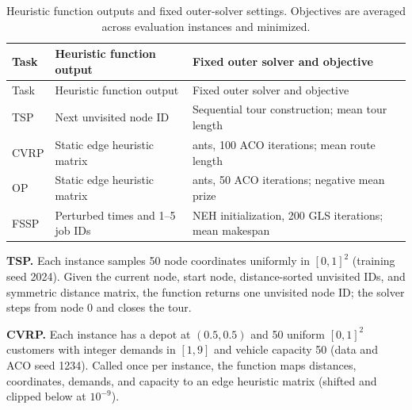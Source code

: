 \documentclass{article}
\begin{document}
\begin{longtable}[]{@{}
  >{\raggedright\arraybackslash}p{}
  >{\raggedright\arraybackslash}p{}
  >{\raggedright\arraybackslash}p{}@{}}
\caption{Heuristic function outputs and fixed outer-solver settings. Objectives are averaged across evaluation instances and minimized.}\tabularnewline
\toprule\noalign{}
\begin{minipage}[b]{\linewidth}\raggedright
Task
\end{minipage} & \begin{minipage}[b]{\linewidth}\raggedright
Heuristic function output
\end{minipage} & \begin{minipage}[b]{\linewidth}\raggedright
Fixed outer solver and objective
\end{minipage} \\
\midrule\noalign{}
\endfirsthead
\toprule\noalign{}
\begin{minipage}[b]{\linewidth}\raggedright
Task
\end{minipage} & \begin{minipage}[b]{\linewidth}\raggedright
Heuristic function output
\end{minipage} & \begin{minipage}[b]{\linewidth}\raggedright
Fixed outer solver and objective
\end{minipage} \\
\midrule\noalign{}
\endhead
\bottomrule\noalign{}
\endlastfoot
TSP & Next unvisited node ID & Sequential tour construction; mean tour length \\
CVRP & Static edge heuristic matrix & 30 ants, 100 ACO iterations; mean route length \\
OP & Static edge heuristic matrix & 20 ants, 50 ACO iterations; negative mean prize \\
FSSP & Perturbed times and 1--5 job IDs & NEH initialization, 200 GLS iterations; mean makespan \\
\end{longtable}

\textbf{TSP.} Each instance samples 50 node coordinates uniformly in \([0,1]^2\) (training seed 2024). Given the current node, start node, distance-sorted unvisited IDs, and symmetric distance matrix, the function returns one unvisited node ID; the solver steps from node 0 and closes the tour.

\textbf{CVRP.} Each instance has a depot at \((0.5,0.5)\) and 50 uniform \([0,1]^2\) customers with integer demands in \([1,9]\) and vehicle capacity 50 (data and ACO seed 1234). Called once per instance, the function maps distances, coordinates, demands, and capacity to an edge heuristic matrix (shifted and clipped below at \(10^{-9}\)).
\end{document}

